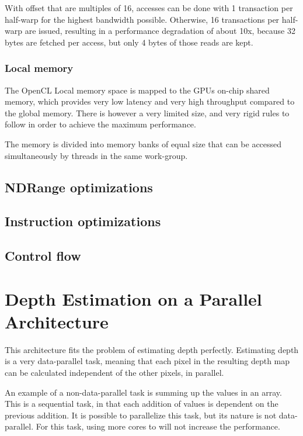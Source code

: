 With offset that are multiples of 16, accesses can be done with 1
transaction per half-warp for the highest bandwidth possible.
Otherwise, 16 transactions per half-warp are issued, resulting in a
performance degradation of about 10x, because 32 bytes are fetched per
access, but only 4 bytes of those reads are kept.

\subsubsection{Local memory}
\label{sect:local-mem-optimization}

The OpenCL Local memory space is mapped to the GPUs on-chip shared
memory, which provides very low latency and very high throughput
compared to the global memory. There is however a very limited size,
and very rigid rules to follow in order to achieve the maximum
performance.

The memory is divided into memory banks of equal size that can be
accessed simultaneously by threads in the same work-group.

\subsection{NDRange optimizations}
\label{sect:ndrange-optimization}



\subsection{Instruction optimizations}
\label{sect:instruction-optimization}

\subsection{Control flow}
\label{sect:control-flow}

\section{Depth Estimation on a Parallel Architecture}

This architecture fits the problem of estimating depth perfectly.
Estimating depth is a very data-parallel task, meaning that each pixel
in the resulting depth map can be calculated independent of the other
pixels, in parallel.

An example of a non-data-parallel task is summing up the values in an
array. This is a sequential task, in that each addition of values is
dependent on the previous addition. It is possible to parallelize this
task, but its nature is not data-parallel. For this task, using more
cores to will not increase the performance.

